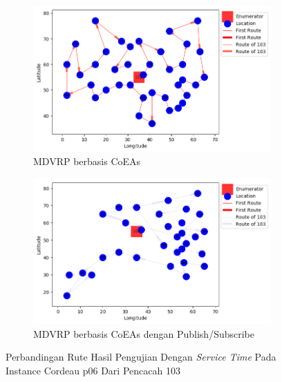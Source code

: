 \begin{figure}[H]
	\centering
	\begin{subfigure}[t]{\textwidth}
		\centering
		\includegraphics[width=\textwidth]{Resources/Images/cordeau_p06_tw/cordeau_p06_tw_103_coes}
		\caption{MDVRP berbasis CoEAs}
		\label{fig:cordeau_p06_tw_103_coes}
	\end{subfigure}
	\begin{subfigure}[t]{\textwidth}
		\centering
		\includegraphics[width=\textwidth]{Resources/Images/cordeau_p06_tw/cordeau_p06_tw_103_pubsub_coes}
		\caption{MDVRP berbasis CoEAs dengan Publish/Subscribe}
		\label{fig:cordeau_p06_tw_103_pubsub_coes}
	\end{subfigure}
	\caption{Perbandingan Rute Hasil Pengujian Dengan \textit{Service Time} Pada Instance Cordeau p06 Dari Pencacah 103}
	\label{fig:cordeau_p06_tw_103}
\end{figure}


